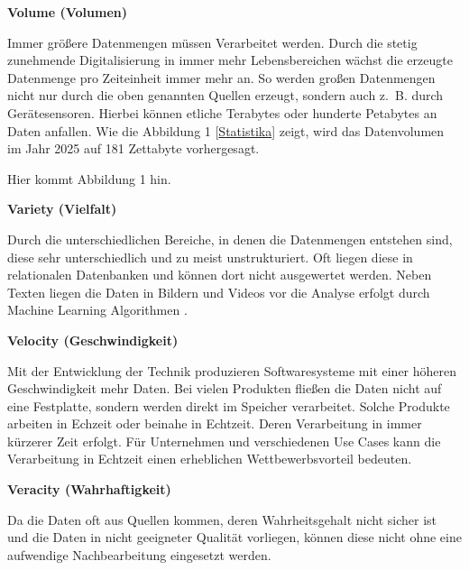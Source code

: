 \textbf{Volume (Volumen)}\vspace{0.2cm}

Immer größere Datenmengen müssen Verarbeitet werden. Durch die stetig zunehmende Digitalisierung in immer mehr Lebensbereichen wächst die erzeugte Datenmenge pro Zeiteinheit immer mehr an. So werden großen Datenmengen nicht nur durch die oben genannten Quellen erzeugt, sondern auch z. B. durch Gerätesensoren. Hierbei können etliche Terabytes oder hunderte Petabytes an Daten anfallen. Wie die Abbildung 1 [\href{https://de.statista.com/statistik/daten/studie/267974/umfrage/prognose-zum-weltweit-generierten-datenvolumen}{Statistika}] zeigt, wird das Datenvolumen im Jahr 2025 auf 181 Zettabyte vorhergesagt.\vspace{0.2cm}

Hier kommt Abbildung 1 hin.\vspace{0.2cm}

\textbf{Variety (Vielfalt)}\vspace{0.2cm}

Durch die unterschiedlichen Bereiche, in denen die Datenmengen entstehen sind, diese sehr unterschiedlich und zu meist unstrukturiert. Oft liegen diese in relationalen Datenbanken und können dort nicht ausgewertet werden. Neben Texten liegen die Daten in Bildern und Videos vor die Analyse erfolgt durch Machine Learning Algorithmen .\vspace{0.5cm}

\textbf{Velocity (Geschwindigkeit)}\vspace{0.2cm}

Mit der Entwicklung der Technik produzieren Softwaresysteme mit einer höheren Geschwindigkeit mehr Daten. Bei vielen Produkten fließen die Daten nicht auf eine Festplatte, sondern werden direkt im Speicher verarbeitet. Solche Produkte arbeiten in Echzeit oder beinahe in Echtzeit. Deren Verarbeitung in immer kürzerer Zeit erfolgt. Für Unternehmen und verschiedenen Use Cases kann die Verarbeitung in Echtzeit einen erheblichen Wettbewerbsvorteil bedeuten.\vspace{0.5cm}

\textbf{Veracity (Wahrhaftigkeit)}\vspace{0.2cm}

Da die Daten oft aus Quellen kommen, deren Wahrheitsgehalt nicht sicher ist und die Daten in nicht geeigneter Qualität vorliegen, können diese nicht ohne eine aufwendige Nachbearbeitung eingesetzt werden.\vspace{0.5cm}

